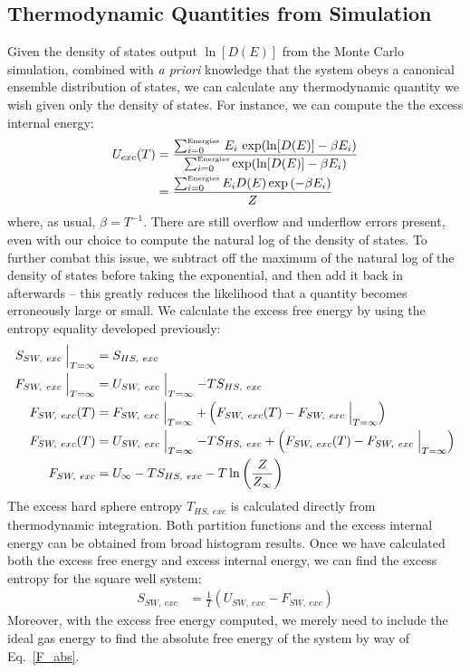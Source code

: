 \documentclass[12pt]{article}
\begin{document}
\subsection{Thermodynamic Quantities from Simulation}
Given the density of states output $\ln[D(E)]$ from the Monte Carlo simulation, combined with {\it a priori} knowledge that the system obeys a canonical ensemble distribution of states, we can calculate any thermodynamic quantity we wish given only the density of states. For instance, we can compute the the excess internal energy:
\begin{align}
     U_{exc}(T) &= \frac{\sum_{i=0}^{\text{\tiny Energies}}\,E_i\, \exp(\ln[D(E)] - \beta E_i)}{\sum_{i=0}^{\text{\tiny Energies}} \exp(\ln[D(E)] - \beta E_i)}\\
     &= \frac{\sum_{i=0}^{\text{\tiny Energies}} E_i D(E)\exp\left(-\beta E_i\right)}{Z}
\end{align} 
where, as usual, $\beta = T^{-1}$. There are still overflow and underflow errors present, even with our choice to compute the natural log of the density of states. To further combat this issue, we subtract off the maximum of the natural log of the density of states before taking the exponential, and then add it back in afterwards -- this greatly reduces the likelihood that a quantity becomes erroneously large or small. We calculate the excess free energy by using the entropy equality developed previously:
\begin{align}
     S_{SW,~exc}\Bigm\lvert_{T=\infty} &= S_{HS,~exc}\\
     F_{SW,~exc}\Bigm\lvert_{T=\infty} &= U_{SW,~exc}\Bigm\lvert_{T=\infty} -TS_{HS,~exc} \\
     F_{SW,~exc}(T) &= F_{SW,~exc}\Bigm\lvert_{T=\infty} + \left(F_{SW,~exc}(T) - F_{SW,~exc}\Bigm\lvert_{T=\infty}\right)
     \\
     F_{SW,~exc}(T) &= U_{SW,~exc}\Bigm\lvert_{T=\infty} -TS_{HS,~exc} + \left(F_{SW,~exc}(T) - F_{SW,~exc}\Bigm\lvert_{T=\infty}\right)
     \\
     F_{SW,~exc} &= U_{\infty} -TS_{HS,~exc} - T\ln\left(\frac{Z}{Z_{\infty}}\right)
\end{align} 
The excess hard sphere entropy $T_{HS,~exc}$ is calculated directly from thermodynamic integration. Both partition functions and the excess internal energy can be obtained from broad histogram results. Once we have calculated both the excess free energy and excess internal energy, we can find the excess entropy for the square well system:
\begin{align}
    S_{SW, ~exc} &= \frac{1}{T}\left(U_{SW,~exc} - F_{SW,~exc} \right)
\end{align}
Moreover, with the excess free energy computed, we merely need to include the ideal gas energy to find the absolute free energy of the system by way of Eq.~\ref{F_abs}. 
\end{document}
